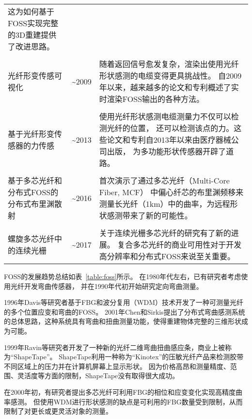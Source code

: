 \begin{table}
\begin{center}
\begin{tabular}{p{}cp{}}
这为如何基于FOSS实现完整的3D重建提供了改进思路。
\\
\\
光纤形变传感可视化 & \textasciitilde 2009 & 随着返回信号愈发复杂，渲染出使用光纤形状感测的电缆变得更具挑战性。
自2009年以来，越来越多的论文和专利概述了实时渲染FOSS输出的各种方法。
\\
\\
基于光纤形变传感器的力传感 & \textasciitilde 2013 & 使用光纤形状感测电缆测量力不仅可以检测光纤的位置，
还可以检测该点的力。这些论文和专利自2013年以来由医疗器械公司出版，
为多功能形状传感器开辟了道路。
\\
\\
基于多芯光纤和分布式FOSS的分布式布里渊散射 & \textasciitilde 2016 & 首次演示了通过多芯光纤（Multi-Core Fiber, MCF）
中偏心纤芯的布里渊频移来测量长光纤（1km）中的曲率，为远程形状感测带来了新的可能性。
\\
\\
螺旋多芯光纤中的连续光栅 & \textasciitilde 2017 & 关于连续光栅多芯光纤的研究有了新的进展。
复合多芯光纤的商业可用性对于开发高分辨率和分布式FOSS来说至关重要。
\\
\bottomrule
\end{tabular}
\end{center}
\end{table}

FOSS的发展趋势总结如表~\ref{table:foss}所示。
在1980年代左右，已有研究者考虑使用光纤开发弯曲传感器\cite{meltz_fiber_1981,schiffner_sensing_1984,Lagakos:87}，
并在1990年代初开始研究定向弯曲测量\cite{clements_fiber_2005,danisch_fiber_1994,greenaway_optical_1999,greenaway_optical_2002,10.1117/12.2302270}。

1996年Davis等研究者基于FBG和波分复用（WDM）技术开发了一种可测量光纤的多个位置应变和弯曲的FOSS\cite{Davis_1996}。 
2001年Chen和Sirkis提出了分布式弯曲感测系统的总体思路，这种系统具有弯曲和扭曲测量功能，使得重建物体完整的三维形状成为可能\cite{chen_method_2001}。

1999年Ravin等研究者开发了一种新的光纤二维弯曲扭曲感应条，商业上被称为“ShapeTape”\cite{ShapeTape}。
ShapeTape利用一种称为“Kinotex”的压敏光纤产品来检测胶带不同区域上的压力并在计算机屏幕上显示形状。
因为价格高昂和测量精度、范围、灵活度等方面的限制，ShapeTape没有取得很大成功。

在2000年初，有研究者提出多芯光纤可利用FBG的相位和应变变化实现高精度曲率感测\cite{flockhart_differential_2006,Araujo:02}。
但使用WDM进行形状感测的缺点是可利用的FBG数量受到限制，从而限制了对更长或更灵活对象的测量。

